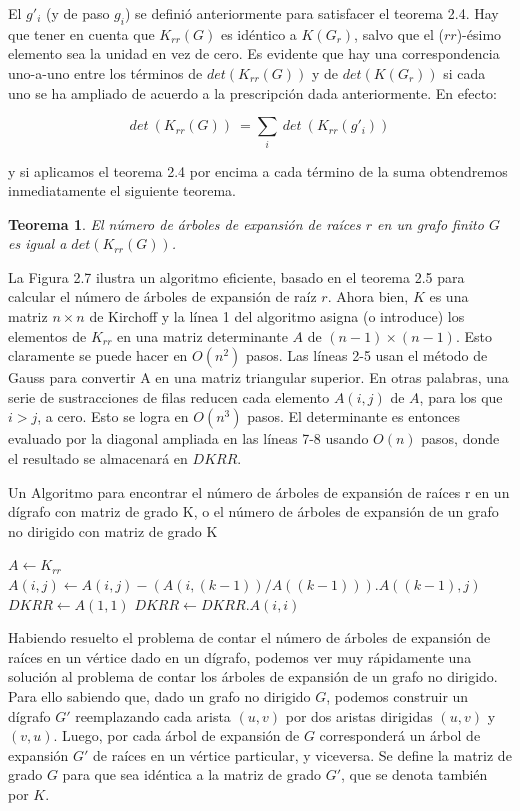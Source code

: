\documentclass[10pt,a5paper]{book}
\newtheorem{teorema}{Teorema}[chapter]
\begin{document}
El $g'_i$ (y de paso $g_i$) se definió anteriormente para satisfacer el teorema 2.4. Hay que tener en cuenta que $K_{rr}(G)$ es idéntico a $K(G_r)$, salvo que el ($rr$)-ésimo elemento sea la unidad en vez de cero. Es evidente que hay una correspondencia uno-a-uno entre los términos de $det(K_{rr}(G))$ y de $det(K(G_r))$ si cada uno se ha ampliado de acuerdo a la prescripción dada anteriormente. En efecto:

\[det\ (K_{rr}(G))\ = \sum_{i}\ det\ (K_{rr}(g'_{i}))\]

y si aplicamos el teorema 2.4 por encima a cada término de la suma obtendremos inmediatamente el siguiente teorema.

\begin{teorema}
El número de árboles de expansión de raíces $r$ en un grafo finito $G$ es igual a $det(K_{rr}(G))$.
\end{teorema}

La Figura 2.7 ilustra un algoritmo eficiente, basado en el teorema 2.5 para calcular el número de árboles de expansión de raíz $r$. Ahora bien, $K$ es una matriz $n \times n$ de Kirchoff y la línea 1 del algoritmo asigna (o introduce) los elementos de $K_{rr}$ en una matriz determinante $A$ de $(n-1) \times (n-1)$. Esto claramente se puede hacer en $O(n^2)$ pasos. Las líneas 2-5 usan el método de Gauss para convertir A en una matriz triangular superior. En otras palabras, una serie de sustracciones de filas reducen cada elemento $A(i,j)$ de $A$, para los que $i > j$, a cero. Esto se logra en $O(n^3)$ pasos. El determinante es entonces evaluado por la diagonal ampliada en las líneas 7-8 usando $O(n)$ pasos, donde el resultado se almacenará en $DKRR$.
\vfill
\begin{algorithm}[H]
\caption{Un Algoritmo para encontrar el número de árboles de expansión de raíces r en un dígrafo con matriz de grado K, o el número de árboles de expansión de un grafo no dirigido con matriz de grado K}
\BlankLine
\dontprintsemicolon
$A \leftarrow K_{rr}$\;
{
  {
    {
      $A(i,j) \leftarrow A(i,j) - (A(i,(k-1))/A((k-1))).A((k-1),j)$\;
    }
  }
}
$DKRR \leftarrow A(1,1)$\;
{
  $DKRR \leftarrow DKRR.A(i,i)$
}
\end{algorithm}

Habiendo resuelto el problema de contar el número de árboles de expansión de raíces en un vértice dado en un dígrafo, podemos ver muy rápidamente una solución al problema de contar los árboles de expansión de un grafo no dirigido. Para ello sabiendo que, dado un grafo no dirigido $G$, podemos construir un dígrafo $G'$ reemplazando cada arista $(u,v)$ por dos aristas dirigidas $(u,v)$ y $(v,u)$. Luego, por cada árbol de expansión de $G$ corresponderá un árbol de expansión $G'$ de raíces en un vértice particular, y viceversa. Se define la matriz de grado $G$ para que sea idéntica a la matriz de grado $G'$, que se denota también por $K$.
\end{document}
